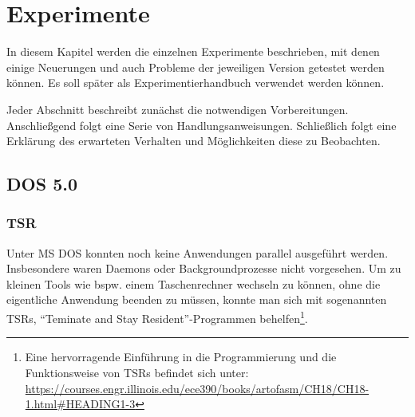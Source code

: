 \chapter{Experimente}
\label{chap:experiments}

In diesem Kapitel werden die einzelnen Experimente beschrieben, mit denen einige Neuerungen und auch Probleme der jeweiligen Version getestet werden können. Es soll später als Experimentierhandbuch verwendet werden können.

Jeder Abschnitt beschreibt zunächst die notwendigen Vorbereitungen.
Anschließgend folgt eine Serie von Handlungsanweisungen.
Schließlich folgt eine Erklärung des erwarteten Verhalten und Möglichkeiten diese zu Beobachten.




\section{DOS 5.0}


	\subsection{TSR}

	Unter MS DOS konnten noch keine Anwendungen parallel ausgeführt werden. Insbesondere waren  Daemons oder Backgroundprozesse nicht vorgesehen.
	Um zu kleinen Tools wie bspw. einem Taschenrechner wechseln zu können, ohne die eigentliche Anwendung beenden zu müssen, konnte man sich mit sogenannten TSRs, "`Teminate and Stay Resident"'-Programmen behelfen\footnote{Eine hervorragende Einführung in die Programmierung und die Funktionsweise von TSRs befindet sich unter: \url{https://courses.engr.illinois.edu/ece390/books/artofasm/CH18/CH18-1.html\#HEADING1-3}}.

